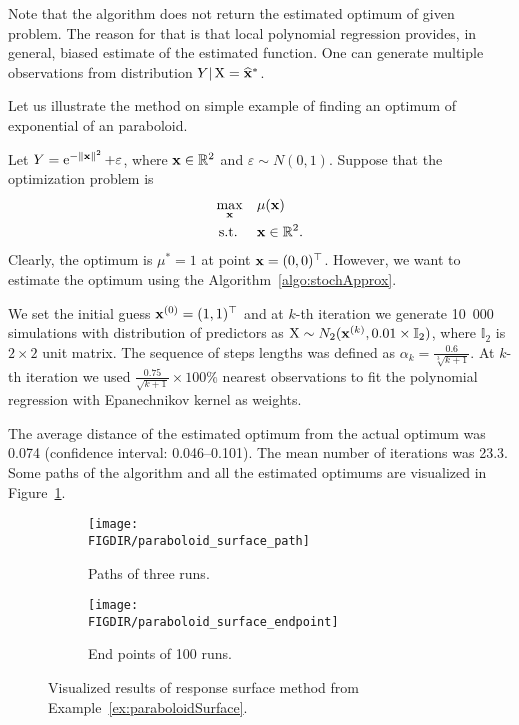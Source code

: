 Note that the algorithm does not return the estimated optimum of given problem. The reason for that is that local polynomial regression provides, in general, biased estimate of the estimated function. One can generate multiple observations from distribution $Y \vert \operatorname{\bm{X}} = \widehat{\mathbf{x}}^{*}$.

Let us illustrate the method on simple example of finding an optimum of exponential of an paraboloid.

\begin{example}
	\label{ex:paraboloidSurface}
	Let $Y = \operatorname{\mathrm{e}}^{- \left\| \mathbf{x} \right\|^2} + \varepsilon$, where $\mathbf{x} \in \mathbb{R}^2$ and $\varepsilon \sim N(0,1)$. Suppose that the optimization problem is
	\begin{equation*}
		\begin{aligned}
			& \underset{\mathbf{x}}{\max} & & \mu (\mathbf{x}) \\
			& \operatorname{\textrm{s.t.}} & & \mathbf{x} \in \mathbb{R}^2.
		\end{aligned}
	\end{equation*}
	Clearly, the optimum is $\mu^{*} = 1$ at point $\mathbf{x} = (0,0)^{\top}$. However, we want to estimate the optimum using the Algorithm~\ref{algo:stochApprox}.
	
	We set the initial guess $\mathbf{x}^{(0)} = (1,1)^{\top}$ and at $k$-th iteration we generate 10~000 simulations with distribution of predictors as $\operatorname{\bm{X}} \sim N_2 (\mathbf{x}^{(k)}, 0.01 \times \mathbb{I}_2)$, where $\mathbb{I}_2$ is $2 \times 2$ unit matrix. The sequence of steps lengths was defined as $\alpha_k = \frac{0.6}{\sqrt[3]{k+1}}$. At $k$-th iteration we used $\frac{0.75}{\sqrt{k+1}} \times 100\%$ nearest observations to fit the polynomial regression with Epanechnikov kernel as weights.
	
	The average distance of the estimated optimum from the actual optimum was 0.074 (confidence interval: 0.046--0.101). The mean number of iterations was 23.3. Some paths of the algorithm and all the estimated optimums are visualized in Figure~\ref{fig:paraboloidSurface}.
	
	\begin{figure}[t]
		\centering
		
			\begin{subfigure}[b]{0.45\textwidth}
				\centering
				\texttt{[image: \\FIGDIR/paraboloid\_surface\_path]}
				\caption{Paths of three runs.}
			\end{subfigure}
			\hfill
			\begin{subfigure}[b]{0.45\textwidth}
				\centering
				\texttt{[image: \\FIGDIR/paraboloid\_surface\_endpoint]}
				\caption{End points of 100 runs.}
			\end{subfigure}

		\caption{Visualized results of response surface method from Example~\ref{ex:paraboloidSurface}.}
		\label{fig:paraboloidSurface}
	\end{figure}

	\demo
\end{example}

